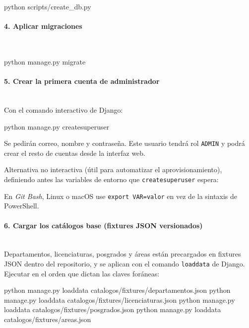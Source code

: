 \begin{Comandos}
python scripts/create_db.py
\end{Comandos}

\paragraph{4. Aplicar migraciones}\mbox{}\\
\begin{Comandos}
python manage.py migrate
\end{Comandos}

\paragraph{5. Crear la primera cuenta de administrador}\mbox{}\\
Con el comando interactivo de Django:

\begin{Comandos}
python manage.py createsuperuser
\end{Comandos}

Se pedirán correo, nombre y contraseña. Este usuario tendrá rol \texttt{ADMIN} y podrá crear el resto de cuentas desde la interfaz web.

Alternativa no interactiva (útil para automatizar el aprovisionamiento), definiendo antes las variables de entorno que \texttt{createsuperuser} espera:


En \emph{Git Bash}, Linux o macOS use \texttt{export VAR=valor} en vez de la sintaxis de PowerShell.

\paragraph{6. Cargar los catálogos base (fixtures JSON versionados)}\mbox{}\\
Departamentos, licenciaturas, posgrados y áreas están precargados en fixtures JSON dentro del repositorio, y se aplican con el comando \texttt{loaddata} de Django. Ejecutar en el orden que dictan las claves foráneas:

\begin{Comandos}
python manage.py loaddata catalogos/fixtures/departamentos.json
python manage.py loaddata catalogos/fixtures/licenciaturas.json
python manage.py loaddata catalogos/fixtures/posgrados.json
python manage.py loaddata catalogos/fixtures/areas.json
\end{Comandos}

